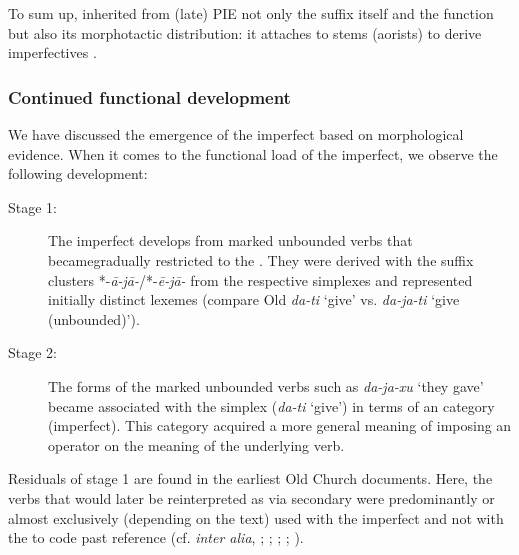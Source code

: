 \documentclass[output=paper]{langsci/langscibook}
\begin{document}
\newpage To sum up,  inherited from (late) PIE not only the suffix itself and the function but also its morphotactic distribution: it attaches to  stems (aorists) to derive imperfectives \citep{Seržant2008}. 

\subsubsection{Continued functional development}\label{sec:wiemerserzant:3.2.5}

We have discussed the emergence of the imperfect based on morphological evidence. When it comes to the functional load of the imperfect, we observe the following development: 

\begin{description}
 \item[Stage 1:] The imperfect develops from marked unbounded verbs that became\linebreak gradually restricted to the . They were derived with the suffix clusters *-\textit{ā-jā-}/*-\textit{ē-jā-} from the respective simplexes and represented initially distinct lexemes (compare Old  \textit{da-ti} ‘give’ vs. \textit{da-ja-ti} ‘give (unbounded)’).
 \item[Stage 2:] The  forms of the marked unbounded verbs such as \textit{da-ja-xu} ‘they gave’ became associated with the simplex (\textit{da-ti} ‘give’) in terms of an  category (imperfect). This category acquired a more general meaning of imposing an  operator on the meaning of the underlying verb.  
\end{description}

Residuals of stage 1 are found in the earliest Old Church  documents. Here, the verbs that would later be reinterpreted as  via secondary  were predominantly or almost exclusively (depending on the text) used with the imperfect and not with the  to code past reference (cf. \textit{inter alia}, \citealt{Borodič1953}; \citealt[141]{Maslov2004[1954]}; \citealt{Kølln1957}; \citealt[386]{Ivanov1964}; \citealt{Seržant2009,Eckhoff2015}).
\end{document}
